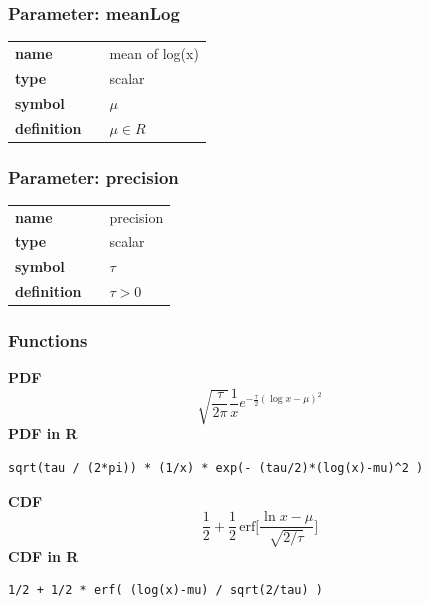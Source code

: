 \subsubsection*{Parameter: meanLog}

\noindent\begin{tabular}{p{2cm}cl}
\textbf{name} & & mean of log(x) \\
\textbf{type} & & scalar \\
\textbf{symbol} & & $\mu$  \\
\textbf{definition} & & $\mu \in R$
\end{tabular}
\subsubsection*{Parameter: precision}

\noindent\begin{tabular}{p{2cm}cl}
\textbf{name} & & precision \\
\textbf{type} & & scalar \\
\textbf{symbol} & & $\tau$  \\
\textbf{definition} & & $\tau > 0$
\end{tabular}
\subsubsection*{Functions}

\smallskip \noindent \hspace{.2cm} \textbf{PDF} 
\begin{equation*}\sqrt{\frac{\tau}{2 \pi}} \frac{1}{x}e^{-\frac{\tau}{2}(\log x-\mu)^2}\end{equation*}
\smallskip \noindent \hspace{.2cm} \textbf{PDF in R}  
\begin{verbatim}sqrt(tau / (2*pi)) * (1/x) * exp(- (tau/2)*(log(x)-mu)^2 )\end{verbatim}
\smallskip \noindent \hspace{.2cm} \textbf{CDF} 
\begin{equation*}\frac12 + \frac12\,\text{erf}\Big[\frac{\ln x-\mu}{\sqrt{2/\tau}}\Big]\end{equation*}
\smallskip \noindent \hspace{.2cm} \textbf{CDF in R} 
\begin{verbatim}1/2 + 1/2 * erf( (log(x)-mu) / sqrt(2/tau) )\end{verbatim}
\smallskip
